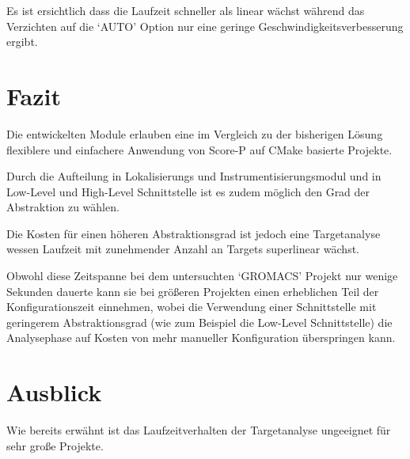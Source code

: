 \documentclass[german,proseminar,hyperref,utf8]{zihpub}
\begin{document}
    \begin{center}
    \end{center}

    Es ist ersichtlich dass die Laufzeit schneller als linear wächst während das Verzichten auf
    die `AUTO' Option nur eine geringe Geschwindigkeitsverbesserung ergibt.


    \newpage
    \section{Fazit}
    Die entwickelten Module erlauben eine im Vergleich zu der bisherigen Lösung flexiblere und einfachere
    Anwendung von Score-P auf CMake basierte Projekte.

    Durch die Aufteilung in Lokalisierungs und Instrumentisierungsmodul und in Low-Level und High-Level
    Schnittstelle ist es zudem möglich den Grad der Abstraktion zu wählen.

    Die Kosten für einen höheren Abstraktionsgrad ist jedoch eine Targetanalyse wessen Laufzeit
    mit zunehmender Anzahl an Targets superlinear wächst.

    Obwohl diese Zeitspanne bei dem untersuchten `GROMACS' Projekt nur wenige Sekunden dauerte
    kann sie bei größeren Projekten einen erheblichen Teil der Konfigurationszeit einnehmen, wobei
    die Verwendung einer Schnittstelle mit geringerem Abstraktionsgrad (wie zum Beispiel die Low-Level
    Schnittstelle) die Analysephase auf Kosten von mehr manueller Konfiguration überspringen kann.
    

    \section{Ausblick}
    Wie bereits erwähnt ist das Laufzeitverhalten der Targetanalyse ungeeignet für sehr große Projekte.
\end{document}
